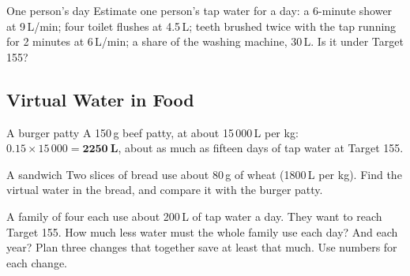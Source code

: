 \begin{wedo}{One person's day}
Estimate one person's tap water for a day: a 6-minute shower at 9\,L/min; four toilet flushes at 4.5\,L; teeth brushed twice with the tap running for 2 minutes at 6\,L/min; a share of the washing machine, 30\,L. Is it under Target 155?
\workbox{5.5cm}
\end{wedo}

\subsection{Virtual Water in Food}\label{sub:a3.2}

\begin{workedex}{A burger patty}
A 150\,g beef patty, at about 15\,000\,L per kg:\\
$0.15 \times 15\,000 = \mathbf{2250\ L}$, about as much as fifteen days of tap water at Target 155.
\end{workedex}

\begin{wedo}{A sandwich}
Two slices of bread use about 80\,g of wheat (1800\,L per kg). Find the virtual water in the bread, and compare it with the burger patty.
\workbox{4.5cm}
\end{wedo}

\label{prac:3}


\label{ext:3}

\task A family of four each use about 200\,L of tap water a day. They want to reach Target 155.
 How much less water must the whole family use each day? And each year?
\workbox{4cm}
 Plan three changes that together save at least that much. Use numbers for each change.
\answerbox{6cm}

\clearpage

\setcounter{section}{3}\renewcommand{\lessonart}{5}
\label{sec:4}

